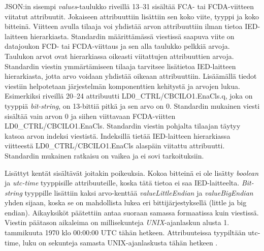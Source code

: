 JSON:in sisempi \emph{values}-taulukko riveillä 13--31 sisältää FCA- tai FCDA-viitteen viitatut attribuutit. Jokaiseen attribuuttiin lisättiin sen koko viite, tyyppi ja koko bitteinä. Viitteen avulla tilaaja voi yhdistää arvon attribuuttiin ilman tietoa IED-laitteen hierarkiasta. Standardin määrittämässä viestissä saapuva viite on datajoukon FCD- tai FCDA-viittaus ja sen alla taulukko pelkkiä arvoja. Taulukon arvot ovat hierarkiassa oikeasti viitattujen attribuuttien arvoja. Standardin viestin ymmärtämiseen tilaaja tarvitsee lisätietoa IED-laitteen hierarkiasta, jotta arvo voidaan yhdistää oikeaan attribuuttiin. Lisäämällä tiedot viestiin helpotetaan järjestelmän komponenttien kehitystä ja arvojen lukua. Esimerkiksi riveillä 20--24 attribuutti LD0\_CTRL/CBCILO1.EnaCls.q, joka on tyyppiä \emph{bit-string}, on 13-bittiä pitkä ja sen arvo on 0. Standardin mukainen viesti sisältää vain arvon 0 ja siihen viittavaan FCDA-viitten LD0\_CTRL/CBCILO1.EnaCls. Standardin viestin pohjalta tilaajan täytyy katsoa arvon indeksi viestistä. Indeksillä tietää IED-laitteen hierarkiassa viitteestä LD0\_CTRL/CBCILO1.EnaCls alaspäin viitattu attribuutti. Standardin mukainen ratkaisu on vaikea ja ei sovi tarkoituksiin.

Lisättyt kentät sisältävät joitakin poikeuksia. Kokoa bitteinä ei ole lisätty \emph{boolean} ja \emph{utc-time} tyyppisille attribuuteille, koska tätä tietoa ei saa IED-laitteelta. \emph{Bit-string} tyyppille lisättiin kaksi arvo-kenttää \emph{valueLittleEndian} ja \emph{valueBigEndian} yhden sijaan, koska se on mahdollista lukea eri bittijärjestyksellä (little ja big endian). Aikayksiköt päätettiin antaa suoraan samassa formaatissa kuin viestissä. Viestin päätason aikaleima on millisekunteja \emph{UNIX}-ajanlaskun alusta 1. tammikuuta 1970 klo 00:00:00 UTC tähän hetkeen. Attribuuteissa tyypiltään utc-time, luku on sekunteja samasta UNIX-ajanlaskusta tähän hetkeen \mbox{\cite[s.~26--27]{IEC61850-7-2}}.